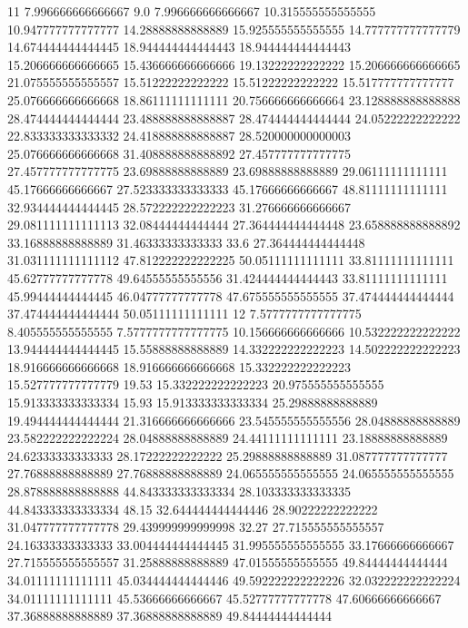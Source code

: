 11 7.996666666666667 9.0 7.996666666666667 10.315555555555555 10.947777777777777 14.28888888888889 15.925555555555555 14.777777777777779 14.674444444444445 18.944444444444443 18.944444444444443 15.206666666666665 15.436666666666666 19.13222222222222 15.206666666666665 21.075555555555557 15.51222222222222 15.51222222222222 15.517777777777777 25.076666666666668 18.86111111111111 20.756666666666664 23.128888888888888 28.474444444444444 23.488888888888887 28.474444444444444 24.05222222222222 22.833333333333332 24.418888888888887 28.520000000000003 25.076666666666668 31.408888888888892 27.457777777777775 27.457777777777775 23.69888888888889 23.69888888888889 29.06111111111111 45.17666666666667 27.523333333333333 45.17666666666667 48.81111111111111 32.934444444444445 28.572222222222223 31.276666666666667 29.081111111111113 32.08444444444444 27.364444444444448 23.658888888888892 33.16888888888889 31.46333333333333 33.6 27.364444444444448 31.031111111111112 47.812222222222225 50.05111111111111 33.81111111111111 45.62777777777778 49.64555555555556 31.424444444444443 33.81111111111111 45.99444444444445 46.04777777777778 47.675555555555555 37.474444444444444 37.474444444444444 50.05111111111111
12 7.5777777777777775 8.405555555555555 7.5777777777777775 10.156666666666666 10.532222222222222 13.944444444444445 15.55888888888889 14.332222222222223 14.502222222222223 18.916666666666668 18.916666666666668 15.332222222222223 15.527777777777779 19.53 15.332222222222223 20.975555555555555 15.913333333333334 15.93 15.913333333333334 25.29888888888889 19.494444444444444 21.316666666666666 23.545555555555556 28.04888888888889 23.582222222222224 28.04888888888889 24.44111111111111 23.18888888888889 24.62333333333333 28.17222222222222 25.29888888888889 31.087777777777777 27.76888888888889 27.76888888888889 24.065555555555555 24.065555555555555 28.878888888888888 44.843333333333334 28.103333333333335 44.843333333333334 48.15 32.644444444444446 28.90222222222222 31.047777777777778 29.439999999999998 32.27 27.715555555555557 24.16333333333333 33.004444444444445 31.995555555555555 33.17666666666667 27.715555555555557 31.25888888888889 47.01555555555555 49.84444444444444 34.01111111111111 45.034444444444446 49.592222222222226 32.032222222222224 34.01111111111111 45.53666666666667 45.52777777777778 47.60666666666667 37.36888888888889 37.36888888888889 49.84444444444444
